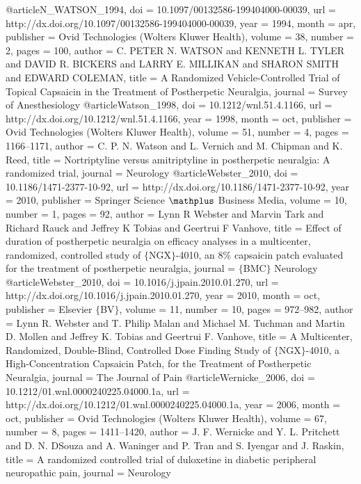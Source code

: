 @article{N_WATSON_1994,
	doi = {10.1097/00132586-199404000-00039},
	url = {http://dx.doi.org/10.1097/00132586-199404000-00039},
	year = 1994,
	month = {apr},
	publisher = {Ovid Technologies (Wolters Kluwer Health)},
	volume = {38},
	number = {2},
	pages = {100},
	author = {C. PETER N. WATSON and KENNETH L. TYLER and DAVID R. BICKERS and LARRY E. MILLIKAN and SHARON SMITH and EDWARD COLEMAN},
	title = {A Randomized Vehicle-Controlled Trial of Topical Capsaicin in the Treatment of Postherpetic Neuralgia},
	journal = {Survey of Anesthesiology}
}
@article{Watson_1998,
	doi = {10.1212/wnl.51.4.1166},
	url = {http://dx.doi.org/10.1212/wnl.51.4.1166},
	year = 1998,
	month = {oct},
	publisher = {Ovid Technologies (Wolters Kluwer Health)},
	volume = {51},
	number = {4},
	pages = {1166--1171},
	author = {C. P. N. Watson and L. Vernich and M. Chipman and K. Reed},
	title = {Nortriptyline versus amitriptyline in postherpetic neuralgia: A randomized trial},
	journal = {Neurology}
}
@article{Webster_2010,
	doi = {10.1186/1471-2377-10-92},
	url = {http://dx.doi.org/10.1186/1471-2377-10-92},
	year = 2010,
	publisher = {Springer Science $\mathplus$ Business Media},
	volume = {10},
	number = {1},
	pages = {92},
	author = {Lynn R Webster and Marvin Tark and Richard Rauck and Jeffrey K Tobias and Geertrui F Vanhove},
	title = {Effect of duration of postherpetic neuralgia on efficacy analyses in a multicenter, randomized, controlled study of $\lbrace$NGX$\rbrace$-4010, an 8{\%} capsaicin patch evaluated for the treatment of postherpetic neuralgia},
	journal = {$\lbrace$BMC$\rbrace$ Neurology}
}
@article{Webster_2010,
	doi = {10.1016/j.jpain.2010.01.270},
	url = {http://dx.doi.org/10.1016/j.jpain.2010.01.270},
	year = 2010,
	month = {oct},
	publisher = {Elsevier $\lbrace$BV$\rbrace$},
	volume = {11},
	number = {10},
	pages = {972--982},
	author = {Lynn R. Webster and T. Philip Malan and Michael M. Tuchman and Martin D. Mollen and Jeffrey K. Tobias and Geertrui F. Vanhove},
	title = {A Multicenter, Randomized, Double-Blind, Controlled Dose Finding Study of $\lbrace$NGX$\rbrace$-4010, a High-Concentration Capsaicin Patch, for the Treatment of Postherpetic Neuralgia},
	journal = {The Journal of Pain}
}
@article{Wernicke_2006,
	doi = {10.1212/01.wnl.0000240225.04000.1a},
	url = {http://dx.doi.org/10.1212/01.wnl.0000240225.04000.1a},
	year = 2006,
	month = {oct},
	publisher = {Ovid Technologies (Wolters Kluwer Health)},
	volume = {67},
	number = {8},
	pages = {1411--1420},
	author = {J. F. Wernicke and Y. L. Pritchett and D. N. D{\textquotesingle}Souza and A. Waninger and P. Tran and S. Iyengar and J. Raskin},
	title = {A randomized controlled trial of duloxetine in diabetic peripheral neuropathic pain},
	journal = {Neurology}
}
